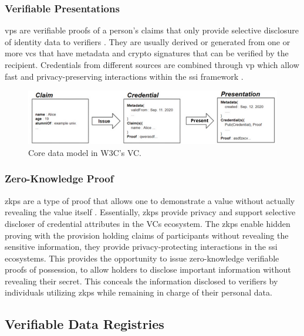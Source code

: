 \subsubsection{Verifiable Presentations}

\gls{vp}s are verifiable proofs of a person's claims that only provide selective disclosure of identity data to verifiers \cite{w3cvcdatamodel}. They are usually derived or 
generated from one or more \gls{vc}s that have metadata and crypto signatures that can be verified by the recipient. Credentials from different sources are combined through 
\gls{vp} which allow fast and privacy-preserving interactions within the \gls{ssi} framework \cite{9333857}.

\begin{figure}[h]  
  \centering
  \includegraphics[width=1\textwidth]{Images/c4_4.png} 
  \caption{Core data model in W3C's VC.}
\end{figure}

\subsubsection{Zero-Knowledge Proof}

\gls{zkp}s are a type of proof that allows one to demonstrate a value without actually revealing the value itself \cite{w3cvcdatamodel}. Essentially, \gls{zkp}s provide privacy 
and support selective discloser of credential attributes in the VCs ecosystem. The \gls{zkp}s enable hidden proving with the provision holding claims of participants without 
revealing the sensitive information, they provide privacy-protecting interactions in the \gls{ssi} ecosystems. This provides the opportunity to issue zero-knowledge verifiable 
proofs of possession, to allow holders to disclose important information without revealing their secret. This conceals the information disclosed to verifiers by individuals 
utilizing \gls{zkp}s while remaining in charge of their personal data.

\subsection{Verifiable Data Registries}

